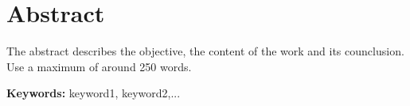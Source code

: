 \section*{Abstract}


The abstract describes the objective, the content of the work and its counclusion. Use a maximum of around 250 words.

\vfill

\textbf{\Large Keywords:} keyword1, keyword2,...

\cleardoublepage

